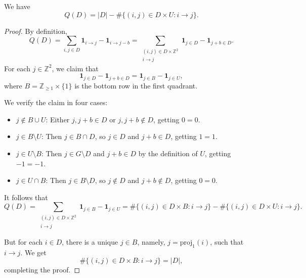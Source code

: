\documentclass[10pt,a4paper]{amsart}
\begin{document}
\begin{lemma}\label{lem:deficit}
We have 
    \[ Q(D)=|D|-\#\{(i,j)\in D\times U: i\to j\}.\]
\end{lemma}

\begin{proof}
By definition,
\[
Q(D)=\sum_{i,j\in D} \mathbf{1}_{i\to j}-\mathbf{1}_{i\to j-b}=\sum_{\substack{(i,j)\in D\times \mathbb{Z}^2\\i\to j}} \mathbf{1}_{j\in D}-\mathbf{1}_{j+b\in D}.
\]
For each $j\in \mathbb{Z}^2$, we claim that 
\begin{equation}\label{eq:reduction to boundary}
    \mathbf{1}_{j\in D}-\mathbf{1}_{j+b\in D}=\mathbf{1}_{j\in B}-\mathbf{1}_{j\in U},
\end{equation}
where $B=\mathbb{Z}_{\geq 1}\times \{1\}$ is the bottom row in the first quadrant.

We verify the claim in four cases:
\begin{itemize}
    \item $j\notin B\cup U$: Either $j,j+b\in D$ or $j,j+b\notin D$, getting $0=0$.
    \item $j\in B\setminus U$: Then $j\in B\cap D$, so $j\in D$ and $j+b\in D$, getting $1=1$.
    \item $j\in U\setminus B$: Then $j\in G\setminus D$ and $j+b\in D$ by the definition of $U$, getting $-1=-1$.
    \item $j\in U\cap B$: Then $j\in B\setminus D$, so $j\notin D$ and $j+b\notin D$, getting $0=0$.
\end{itemize}

It follows that
\[ Q(D)=\sum_{\substack{(i,j)\in D\times \mathbb{Z}^2\\i\to j}} \mathbf{1}_{j\in B}-\mathbf{1}_{j\in U} = \#\{(i,j)\in D\times B: i\to j\} - \#\{(i,j)\in D\times U: i\to j\}. \]

But for each $i\in D$, there is a unique $j\in B$, namely, $j=\mathrm{proj}_1(i)$, such that $i\to j$. We get
\[ \#\{(i,j)\in D\times B: i\to j\} = |D|,\]
completing the proof.
\end{proof}
\end{document}
